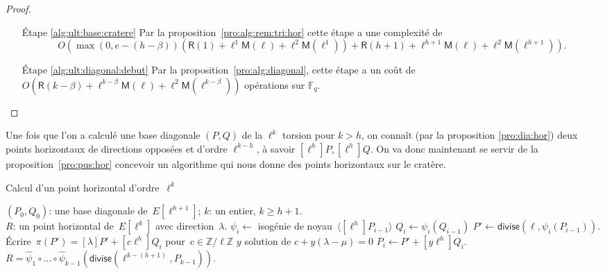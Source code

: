 \documentclass[10pt,a4paper]{book}
\theoremstyle{plain}
\theoremstyle{definition}
\theoremstyle{definition}
\theoremstyle{definition}
\theoremstyle{definition}
\theoremstyle{definition}
\theoremstyle{remark}
\theoremstyle{remark}
\theoremstyle{definition}
\begin{document}
\begin{proof}
\begin{enumerate}
\item[\'Etape \ref{alg:ult:base:cratere}] Par la proposition~\ref{pro:alg:rem:tri:hor}
cette étape a une complexité de \[O(\max(0,e-(h-\beta))(\mathsf{R}(1)+
\ell^{1}\mathsf{M}(\ell)+\ell^2 \mathsf{M}(\ell^{1}))+\mathsf{R}(h+1)+
\ell^{h+1}\mathsf{M}(\ell)+\ell^2 \mathsf{M}(\ell^{h+1})).\]

\item[\'Etape \ref{alg:ult:diagonal:debut}]	Par la proposition~\ref{pro:alg:diagonal}, cette étape a un coût de $O(\mathsf{R}(k-\beta) + \ell^{k-\beta}\mathsf{M}(\ell) + \ell^2\mathsf{M}(\ell^{k-\beta}) )$ opérations sur $\mathbb{F}_q$.

\end{enumerate}
\end{proof}

Une fois que l'on a calculé une base diagonale $(P,Q)$ de la $\ell^k$ torsion 
pour $k>h$, on connaît (par la proposition \ref{pro:dia:hor}) deux points 
horizontaux  de directions opposées et d'ordre $\ell^{k-h}$, à savoir $[\ell^{h}]P, 
[\ell^{h}]Q$. On va donc maintenant se servir de la proposition~\ref{pro:pus:hor} 
concevoir un algorithme qui nous donne des points horizontaux sur le cratère.

\begin{algorithm}
\caption{\label{alg:hor:poi}Calcul d'un point horizontal d'ordre~$\ell^k$}
\begin{algorithmic}[1]
\REQUIRE $(P_0, Q_0)$: une base diagonale de~$E[\ell^{h+1}]$; $k$: un entier,
$k \geqslant h + 1$.\\
\ENSURE $R$: un point horizontal de~$E[\ell^k]$ avec direction~$\lambda$.
\STATE $\psi_i \gets $ isogénie de noyau~$\langle [\ell^{h}] P_{i-1} \rangle$
\STATE $Q_{i} \gets \psi_i(Q_{i-1})$
\STATE\label{alg:horizontal:divide} $P' \gets \mathsf{divise}(\ell, \psi_i(P_{i-1}))$.
\STATE\label{alg:horizontal:frob} \'Ecrire~$\pi(P') = [\lambda] P' + [c \ell^{h}] Q_i$ pour~$c \in \mathbb{Z}/\ell\mathbb{Z}$
\STATE $y$ solution de $c+y(\lambda - \mu)=0$
\STATE  $P_{i} \gets P' + [y \ell^h] Q_i$.
\ENDFOR
\RETURN\label{alg:horizontal:final} $R = \widehat{\psi}_1 \circ … \circ \widehat{\psi}_{k-1}
  (\mathsf{divise}( \ell^{k-(h+1)}, P_{k-1}) )$. 
\end{algorithmic}
\end{algorithm}
\end{document}
